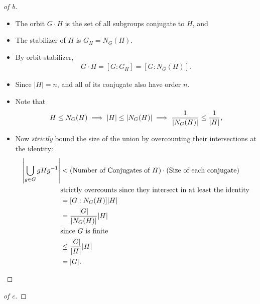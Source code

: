 \begin{solution}
\begin{proof}[of b]
\begin{itemize}
\item
  The orbit \(G\cdot H\) is the set of all subgroups conjugate to \(H\),
  and
\item
  The stabilizer of \(H\) is \(G_H = N_G(H)\).
\item
  By orbit-stabilizer,
  \begin{align*}
  G\cdot H = [G: G_H] = [G: N_G(H)]
  .\end{align*}
\item
  Since \({\left\lvert {H} \right\rvert} = n\), and all of its conjugate
  also have order \(n\).
\item
  Note that
  \begin{align*}
  H\leq N_G(H) \implies {\left\lvert {H} \right\rvert} \leq {\left\lvert {N_G(H)} \right\rvert} \implies {1\over {\left\lvert {N_G(H)} \right\rvert}} \leq {1\over {\left\lvert {H} \right\rvert}}
  ,\end{align*}
\item
  Now \emph{strictly} bound the size of the union by overcounting their
  intersections at the identity:
  \begin{align*}
  {\left\lvert {\bigcup_{g\in G}gHg^{-1}} \right\rvert} 
  &< (\text{Number of Conjugates of } H) \cdot (\text{Size of each conjugate}) \\ 
  & \text{strictly overcounts since they intersect in at least the identity} \\
  &= [G: N_G(H)] {\left\lvert {H} \right\rvert} \\
  &= {{\left\lvert {G} \right\rvert} \over {\left\lvert {N_G(H)} \right\rvert}} {\left\lvert {H} \right\rvert} \\
  & \text{since $G$ is finite} \\
  &\leq {{\left\lvert {G} \right\rvert} \over {\left\lvert {H} \right\rvert}} {\left\lvert {H} \right\rvert} \\
  &= {\left\lvert {G} \right\rvert}
  .\end{align*}
\end{itemize}

\end{proof}

\begin{proof}[of c]

\envlist


\end{proof}
\end{solution}
